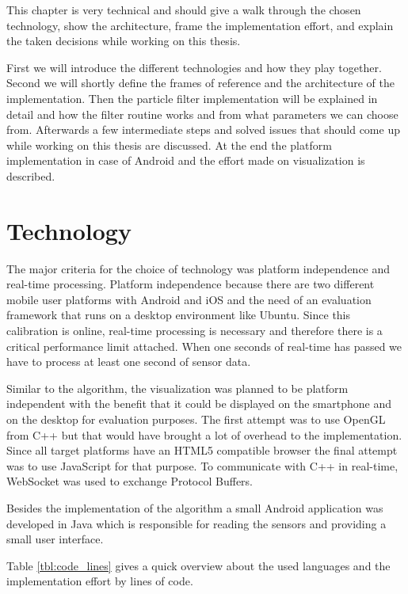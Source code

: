 This chapter is very technical and should give a walk through the chosen technology, show the architecture, frame the implementation effort, and explain the taken decisions while working on this thesis.

First we will introduce the different technologies and how they play together. Second we will shortly define the frames of reference and the architecture of the implementation. Then the particle filter implementation will be explained in detail and how the filter routine works and from what parameters we can choose from. Afterwards a few intermediate steps and solved issues that should come up while working on this thesis are discussed. At the end the platform implementation in case of Android and the effort made on visualization is described.

\section{Technology}

The major criteria for the choice of technology was platform independence and real-time processing. Platform independence because there are two different mobile user platforms with Android and iOS and the need of an evaluation framework that runs on a desktop environment like Ubuntu. Since this calibration is online, real-time processing is necessary and therefore there is a critical performance limit attached. When one seconds of real-time has passed we have to process at least one second of sensor data.

Similar to the algorithm, the visualization was planned to be platform independent with the benefit that it could be displayed on the smartphone and on the desktop for evaluation purposes. The first attempt was to use OpenGL from C++ but that would have brought a lot of overhead to the implementation. Since all target platforms have an HTML5 compatible browser the final attempt was to use JavaScript for that purpose. To communicate with C++ in real-time, WebSocket was used to exchange Protocol Buffers.

Besides the implementation of the algorithm a small Android application was developed in Java which is responsible for reading the sensors and providing a small user interface.

Table \ref{tbl:code_lines} gives a quick overview about the used languages and the implementation effort by lines of code.

